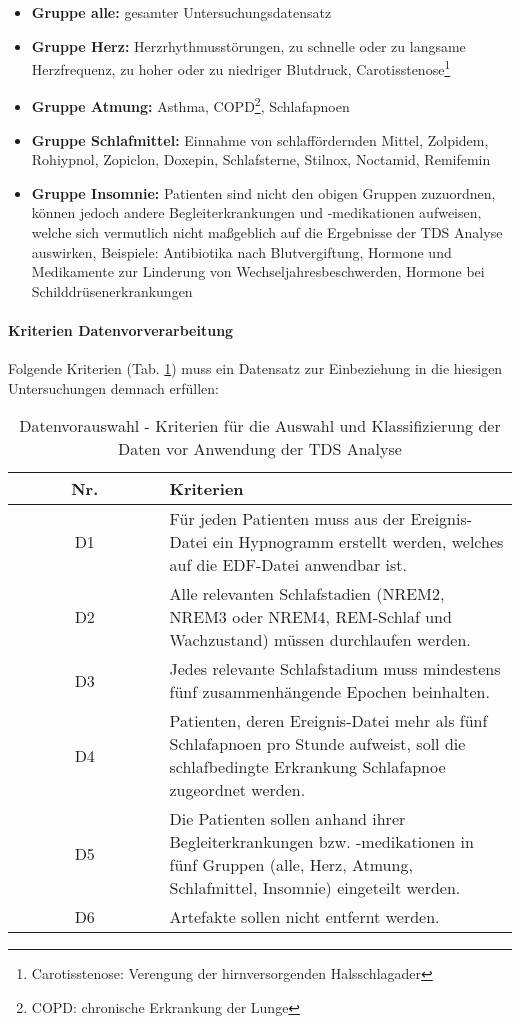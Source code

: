 \begin{itemize}
\item \textbf{Gruppe alle:} gesamter Untersuchungsdatensatz
\item \textbf{Gruppe Herz:} Herzrhythmusstörungen, zu schnelle oder zu langsame Herzfrequenz, zu hoher oder zu niedriger Blutdruck, Carotisstenose\footnote{Carotisstenose: Verengung der hirnversorgenden Halsschlagader}
\item \textbf{Gruppe Atmung:} Asthma, COPD\footnote{COPD: chronische Erkrankung der Lunge}, Schlafapnoen
\item \textbf{Gruppe Schlafmittel:} Einnahme von schlaffördernden Mittel, Zolpidem, Rohiypnol, Zopiclon, Doxepin, Schlafsterne, Stilnox, Noctamid, Remifemin
\item \textbf{Gruppe Insomnie:} Patienten sind nicht den obigen Gruppen zuzuordnen, können jedoch andere Begleiterkrankungen und -medikationen aufweisen, welche sich vermutlich nicht maßgeblich auf die Ergebnisse der \acs{TDS} Analyse auswirken, Beispiele: Antibiotika nach Blutvergiftung, Hormone und Medikamente zur Linderung von Wechseljahresbeschwerden, Hormone bei Schilddrüsenerkrankungen
\end{itemize}

\paragraph{Kriterien Datenvorverarbeitung} Folgende Kriterien (Tab. \ref{tab:Datenvorauswahl}) muss ein Datensatz zur Einbeziehung in die hiesigen Untersuchungen demnach erfüllen:

\begin{table}[H] 
\begin{tabularx}{\textwidth}{cX}
\toprule
\multicolumn{1}{c}{\textbf{~~~~~~Nr.~~~~~~}} & \multicolumn{1}{l}{\textbf{Kriterien}}\\
\midrule 
D1 & Für jeden Patienten muss aus der Ereignis-Datei ein Hypnogramm erstellt werden, welches auf die \acs{EDF}-Datei anwendbar ist.\\
D2 & Alle relevanten Schlafstadien (\acs{NREM}2, \acs{NREM}3 oder \acs{NREM}4, \acs{REM}-Schlaf und Wachzustand) müssen durchlaufen werden.\\
D3 & Jedes relevante Schlafstadium muss mindestens fünf zusammenhängende Epochen beinhalten.\\
D4 & Patienten, deren Ereignis-Datei mehr als fünf Schlafapnoen pro Stunde aufweist, soll die schlafbedingte Erkrankung Schlafapnoe zugeordnet werden.\\
D5 & Die Patienten sollen anhand ihrer Begleiterkrankungen bzw. -medikationen in fünf Gruppen (alle, Herz, Atmung, Schlafmittel, Insomnie) eingeteilt werden.\\
D6 & Artefakte sollen nicht entfernt werden.\\
\bottomrule
\end{tabularx}
\caption[Datenvorauswahl - Kriterien]{Datenvorauswahl - Kriterien für die Auswahl und Klassifizierung der Daten vor Anwendung der \acs{TDS} Analyse}
\label{tab:Datenvorauswahl}
\end{table}

